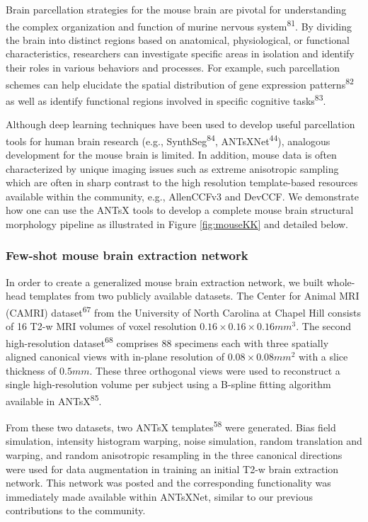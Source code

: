 \documentclass[
  12pt,
]{article}
\begin{document}
Brain parcellation strategies for the mouse brain are pivotal for
understanding the complex organization and function of murine nervous
system\textsuperscript{81}. By dividing the brain into distinct regions
based on anatomical, physiological, or functional characteristics,
researchers can investigate specific areas in isolation and identify
their roles in various behaviors and processes. For example, such
parcellation schemes can help elucidate the spatial distribution of gene
expression patterns\textsuperscript{82} as well as identify functional
regions involved in specific cognitive tasks\textsuperscript{83}.

Although deep learning techniques have been used to develop useful
parcellation tools for human brain research (e.g.,
SynthSeg\textsuperscript{84}, ANTsXNet\textsuperscript{44}), analogous
development for the mouse brain is limited. In addition, mouse data is
often characterized by unique imaging issues such as extreme anisotropic
sampling which are often in sharp contrast to the high resolution
template-based resources available within the community, e.g.,
AllenCCFv3 and DevCCF. We demonstrate how one can use the ANTsX tools to
develop a complete mouse brain structural morphology pipeline as
illustrated in Figure \ref{fig:mouseKK} and detailed below.

\subsubsection{Few-shot mouse brain extraction
network}\label{few-shot-mouse-brain-extraction-network}

In order to create a generalized mouse brain extraction network, we
built whole-head templates from two publicly available datasets. The
Center for Animal MRI (CAMRI) dataset\textsuperscript{67} from the
University of North Carolina at Chapel Hill consists of 16 T2-w MRI
volumes of voxel resolution \(0.16
\times 0.16 \times 0.16 mm^3\). The second high-resolution
dataset\textsuperscript{68} comprises 88 specimens each with three
spatially aligned canonical views with in-plane resolution of
\(0.08 \times 0.08 mm^2\) with a slice thickness of \(0.5 mm\). These
three orthogonal views were used to reconstruct a single high-resolution
volume per subject using a B-spline fitting algorithm available in
ANTsX\textsuperscript{85}.

From these two datasets, two ANTsX templates\textsuperscript{58} were
generated. Bias field simulation, intensity histogram warping, noise
simulation, random translation and warping, and random anisotropic
resampling in the three canonical directions were used for data
augmentation in training an initial T2-w brain extraction network. This
network was posted and the corresponding functionality was immediately
made available within ANTsXNet, similar to our previous contributions to
the community.
\end{document}
